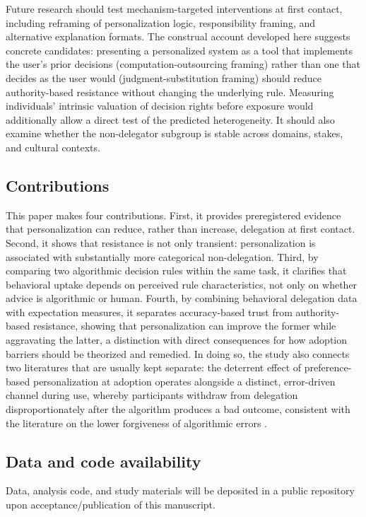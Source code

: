 \documentclass[a4paper, 12pt, fleqn]{article}
\theoremstyle{definition}
\begin{document}
Future research should test mechanism-targeted interventions at first contact, including reframing of personalization logic, responsibility framing, and alternative explanation formats. The construal account developed here suggests concrete candidates: presenting a personalized system as a tool that implements the user's prior decisions (computation-outsourcing framing) rather than one that decides as the user would (judgment-substitution framing) should reduce authority-based resistance without changing the underlying rule. Measuring individuals' intrinsic valuation of decision rights \citep{Bartling2014,Owens2014} before exposure would additionally allow a direct test of the predicted heterogeneity. It should also examine whether the non-delegator subgroup is stable across domains, stakes, and cultural contexts.

\subsection{Contributions}
This paper makes four contributions. First, it provides preregistered evidence that personalization can reduce, rather than increase, delegation at first contact. Second, it shows that resistance is not only transient: personalization is associated with substantially more categorical non-delegation. Third, by comparing two algorithmic decision rules within the same task, it clarifies that behavioral uptake depends on perceived rule characteristics, not only on whether advice is algorithmic or human. Fourth, by combining behavioral delegation data with expectation measures, it separates accuracy-based trust from authority-based resistance, showing that personalization can improve the former while aggravating the latter, a distinction with direct consequences for how adoption barriers should be theorized and remedied. In doing so, the study also connects two literatures that are usually kept separate: the deterrent effect of preference-based personalization at adoption operates alongside a distinct, error-driven channel during use, whereby participants withdraw from delegation disproportionately after the algorithm produces a bad outcome, consistent with the literature on the lower forgiveness of algorithmic errors \citep{Dietvorst2018,Renier2021}.

\subsection{Data and code availability}
Data, analysis code, and study materials will be deposited in a public repository upon acceptance/publication of this manuscript. 
\end{document}
